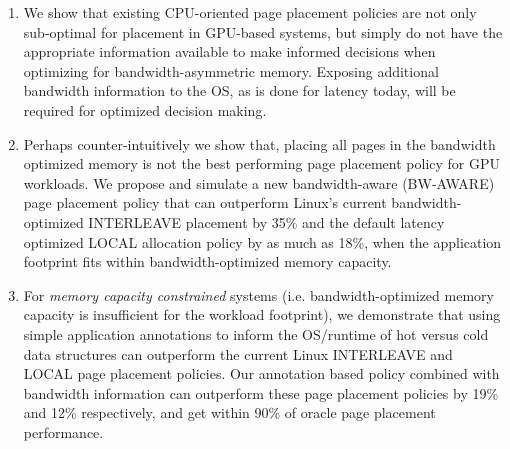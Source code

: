 \begin{enumerate}
\item
We show that existing CPU-oriented page placement policies are not only 
sub-optimal for placement in GPU-based systems, but simply do not have the 
appropriate information available to make informed decisions when optimizing for 
bandwidth-asymmetric memory.  Exposing additional bandwidth information 
to the OS, as is done for latency today, will be required for optimized decision 
making.
\item 
Perhaps counter-intuitively we show that, placing all pages in the 
bandwidth optimized memory is not the best performing page placement 
policy for GPU workloads.  We propose and {\color{black}simulate} a new bandwidth-aware (BW-AWARE) page 
placement policy that can outperform Linux's current bandwidth-optimized 
INTERLEAVE placement by 35\% and the default latency optimized LOCAL allocation 
policy by as much as 18\%, when the application footprint fits 
within bandwidth-optimized memory capacity.  
\item 
For \emph{memory capacity constrained} systems (i.e. bandwidth-optimized memory
capacity is insufficient for the workload footprint), we demonstrate that using
simple application annotations to inform the OS/runtime of hot versus
cold data structures can outperform the current Linux
INTERLEAVE and LOCAL page placement policies.  Our annotation
based policy combined with bandwidth information can outperform these
page placement policies by 19\% and 12\% respectively, and get within
90\% of oracle page placement performance.
\end{enumerate}
